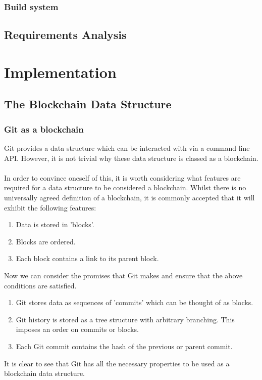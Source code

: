 \documentclass[12pt,a4paper,twoside,openright]{report}
\begin{document}
		\subsection*{Build system}
	\section{Requirements Analysis}
	\chapter{Implementation}
	\section{The Blockchain Data Structure}
	\subsection*{Git as a blockchain}
		Git provides a data structure which can be interacted with via a command line API. However, it is not trivial why these data structure is classed as a blockchain. \\
		\\
		In order to convince oneself of this, it is worth considering what features are required for a data structure to be considered a blockchain. 
		Whilst there is no universally agreed definition of a blockchain, it is commonly accepted that it will exhibit the following features:
		\begin{enumerate}
			\item Data is stored in 'blocks'.
			\item Blocks are ordered.
			\item Each block contains a link to its parent block.
		\end{enumerate}
		Now we can consider the promises that Git makes and ensure that the above conditions are satisfied.\\
		\begin{enumerate}
			\item Git stores data as sequences of 'commits' which can be thought of as blocks.
			\item Git history is stored as a tree structure with arbitrary branching. This imposes an order on commits or blocks.
			\item Each Git commit contains the hash of the previous or parent commit.
		\end{enumerate}
		It is clear to see that Git has all the necessary properties to be used as a blockchain data structure.
\end{document}

